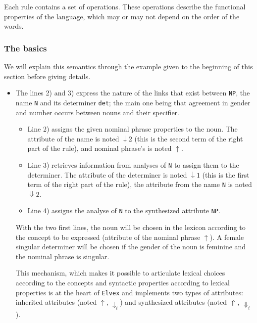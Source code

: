 \documentclass[11pt]{article}
\begin{document}
Each rule contains a set of operations. These operations describe the
functional properties of the language, which may or may not depend on
the order of the words.

\subsubsection*{The basics}

We will explain this semantics through the example given to the
beginning of this section before giving details.

\begin{itemize}
\item The lines 2) and 3) express the nature of the links that
  exist between \texttt{NP}, the name \texttt{N} and its determiner
  \texttt{det}; the main one being that agreement in gender and number
  occurs between nouns and their specifier.

  \begin{itemize}
  \item Line 2) assigns the given nominal phrase properties to the
    noun. The attribute of the name is noted $\downarrow2$
    (this is the second term of the right part of the rule), and
    nominal phrase's is noted $\uparrow$.

  \item Line 3) retrieves information from analyses of \texttt{N} to
    assign them to the determiner.  The attribute of the determiner
   is noted $\downarrow1$ (this is the first term of the right part
    of the rule), the attribute from the name \texttt{N}
    is noted $\Downarrow2$.

  \item Line 4) assigns the analyse of \texttt{N} to the synthesized
    attribute \texttt{NP}.

  \end{itemize}
  
  With the two first lines, the noun will be chosen in the lexicon
  according to the concept to be expressed (attribute of the nominal
  phrase $\uparrow$).  A female singular determiner will be chosen if
  the gender of the noun is feminine and the nominal phrase is
  singular.
  
  This mechanism, which makes it possible to articulate lexical
  choices according to the concepts and syntactic properties according
  to lexical properties is at the heart of \texttt{Elvex} and
  implements two types of attributes: inherited attributes (noted
  $\uparrow$, $\downarrow_i$) and synthesized attributes (noted
  $\Uparrow$, $\Downarrow_i$).
  

\end{itemize}
\end{document}
